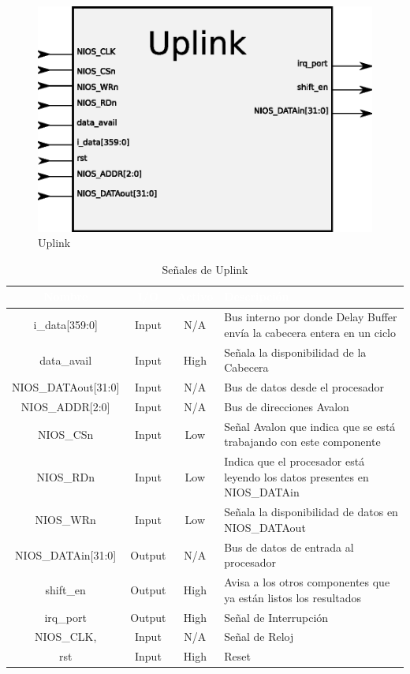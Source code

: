 \begin{figure}[H]
  \centering
	\includegraphics[scale=0.55]{3-arquitectura/graf/bloquplink.eps}
  \caption{Uplink}
  \label{fig:bloquplink}
\end{figure}
	
\begin{table}
	\begin{tabular}{|c|c|c|p{6cm}|} \hline
\rowcolor[gray]{0.1} \textcolor{white}{Nombre} & \textcolor{white}{I/O} & \textcolor{white}{Activo} & \textcolor{white}{Descripción}\\ \hline
\rowcolor[gray]{0.75} i\_data[359:0] & Input & N/A & Bus interno por donde Delay Buffer envía la cabecera entera en un ciclo\\ \hline
\rowcolor[gray]{0.75} data\_avail & Input & High & Señala la disponibilidad de la Cabecera\\ \hline
\rowcolor[gray]{0.75} NIOS\_DATAout[31:0] & Input & N/A & Bus de datos desde el procesador\\ \hline
\rowcolor[gray]{0.75} NIOS\_ADDR[2:0] & Input & N/A & Bus de direcciones Avalon\\ \hline
\rowcolor[gray]{0.75} NIOS\_CSn & Input & Low & Señal Avalon que indica que se está trabajando con este componente\\ \hline
\rowcolor[gray]{0.75} NIOS\_RDn & Input & Low & Indica que el procesador está leyendo los datos presentes en NIOS\_DATAin \\ \hline
\rowcolor[gray]{0.75} NIOS\_WRn & Input & Low & Señala la disponibilidad de datos en NIOS\_DATAout\\ \hline
\rowcolor[gray]{0.9} NIOS\_DATAin[31:0] & Output & N/A & Bus de datos de entrada al procesador\\ \hline
\rowcolor[gray]{0.9} shift\_en & Output & High & Avisa a los otros componentes que ya están listos los resultados\\ \hline
\rowcolor[gray]{0.9} irq\_port & Output & High & Señal de Interrupción\\ \hline
 NIOS\_CLK, & Input & N/A & Señal de Reloj\\ \hline
 rst & Input & High & Reset\\ \hline
	\end{tabular}
	\caption{Señales de Uplink}
	\label{tab:sigup}
\end{table}

